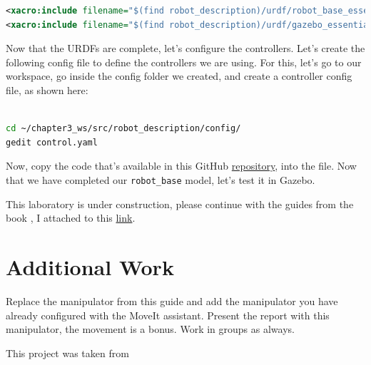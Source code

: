 \documentclass[letterpaper,pdftex]{article}
\begin{document}
\begin{lstlisting}[language=xml]
<xacro:include filename="$(find robot_description)/urdf/robot_base_essentials.xacro" />
<xacro:include filename="$(find robot_description)/urdf/gazebo_essentials_base.xacro" />
\end{lstlisting}

Now that the URDFs are complete, let's configure the controllers. Let's create the following config file to define the controllers we are using. For this, let's go to our workspace, go inside the config folder we created, and create a controller config file, as shown here:

\begin{lstlisting}[language=bash]

cd ~/chapter3_ws/src/robot_description/config/
gedit control.yaml

\end{lstlisting}

Now, copy the code that's available in this GitHub \href{https://github.com/nikorose87/robotics_labs/blob/main/Lab2/Resources/config/control.yaml}{repository}, into the file. Now that we have completed our \verb|robot_base| model, let's test it in Gazebo.

This laboratory is under construction, please continue with the guides from the book \citep{Gandhinathan2020}, I attached to this \href{https://github.com/nikorose87/robotics_labs/blob/main/Lab2/chapter3_remaining_part.pdf}{link}.


\section{Additional Work}

Replace the manipulator from this guide and add the manipulator you have already configured with the MoveIt assistant. Present the report with this manipulator, the movement is a bonus. Work in groups as always.

This project was taken from \cite{Gandhinathan2020}


\end{document}
